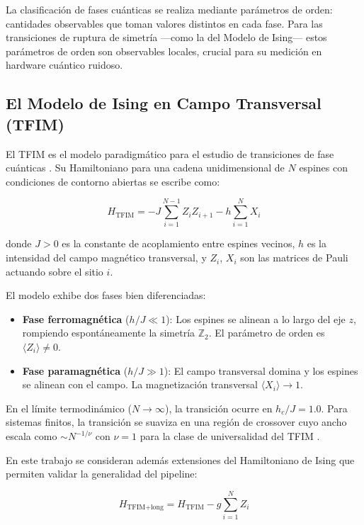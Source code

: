 \documentclass[11pt,a4paper,spanish]{book}
\begin{document}
La clasificación de fases cuánticas se realiza mediante parámetros de orden: cantidades observables que toman valores distintos en cada fase. Para las transiciones de ruptura de simetría ---como la del Modelo de Ising--- estos parámetros de orden son observables locales, crucial para su medición en hardware cuántico ruidoso.

\subsection{El Modelo de Ising en Campo Transversal (TFIM)}

El TFIM es el modelo paradigmático para el estudio de transiciones de fase cuánticas \citep{dutta2015}. Su Hamiltoniano para una cadena unidimensional de $N$ espines con condiciones de contorno abiertas se escribe como:

\begin{equation}
H_{\text{TFIM}} = -J \sum_{i=1}^{N-1} Z_i Z_{i+1} - h \sum_{i=1}^{N} X_i
\label{eq:tfim}
\end{equation}

\noindent donde $J > 0$ es la constante de acoplamiento entre espines vecinos, $h$ es la intensidad del campo magnético transversal, y $Z_i$, $X_i$ son las matrices de Pauli actuando sobre el sitio $i$.

El modelo exhibe dos fases bien diferenciadas:

\begin{itemize}
    \item \textbf{Fase ferromagnética} ($h/J \ll 1$): Los espines se alinean a lo largo del eje $z$, rompiendo espontáneamente la simetría $\mathbb{Z}_2$. El parámetro de orden es $\langle Z_i \rangle \neq 0$.
    \item \textbf{Fase paramagnética} ($h/J \gg 1$): El campo transversal domina y los espines se alinean con el campo. La magnetización transversal $\langle X_i \rangle \to 1$.
\end{itemize}

En el límite termodinámico ($N \to \infty$), la transición ocurre en $h_c/J = 1.0$. Para sistemas finitos, la transición se suaviza en una región de crossover cuyo ancho escala como $\sim N^{-1/\nu}$ con $\nu = 1$ para la clase de universalidad del TFIM \citep{dutta2015, sachdev2011}.

En este trabajo se consideran además extensiones del Hamiltoniano de Ising que permiten validar la generalidad del pipeline:

\begin{equation}
H_{\text{TFIM+long}} = H_{\text{TFIM}} - g \sum_{i=1}^{N} Z_i
\label{eq:tfim_long}
\end{equation}
\end{document}
